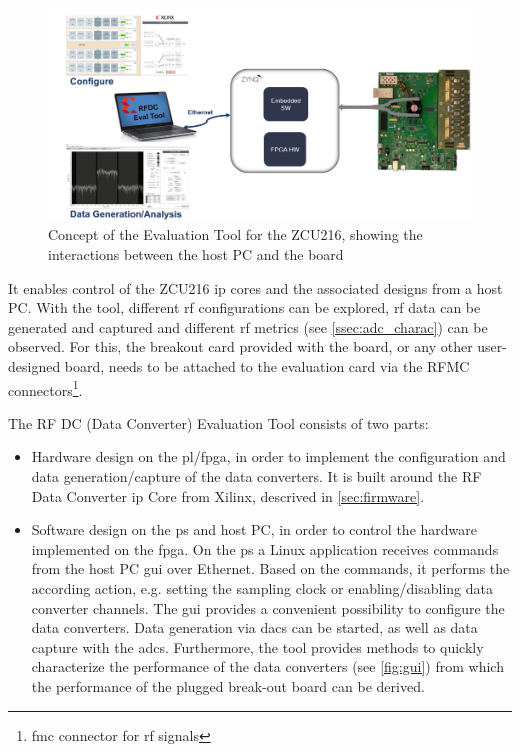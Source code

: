 \begin{figure}[H]
	\centering
	\includegraphics[width = \textwidth]{chap/05-readout/img/zcu216evaltool}
	\caption[ZCU216 Evaluation Tool]{Concept of the Evaluation Tool for the ZCU216, showing the interactions between the host PC and the board \cite{zcu216evaltool}}
	\label{fig:evalTool}
\end{figure}

It enables control of the ZCU216 \gls{ip} cores and the associated designs from a host PC. 
With the tool, different \gls{rf} configurations can be explored, \gls{rf} data can be generated and captured and different \gls{rf} metrics (see \autoref{ssec:adc_charac}) can be observed.  \cite{zcu216evaltool}
For this, the breakout card provided with the board, or any other user-designed board, needs to be attached to the evaluation card via the RFMC connectors\footnote{\gls{fmc} connector for \gls{rf} signals}.

The RF DC (Data Converter) Evaluation Tool consists of two parts:
\begin{itemize}
	\item Hardware design on the \gls{pl}/\gls{fpga}, in order to implement the configuration and data generation/capture of the data converters.
	It is built around the RF Data Converter \gls{ip} Core from Xilinx, descrived in \autoref{sec:firmware}.
	\item Software design on the \gls{ps} and host PC, in order to control the hardware implemented on the \gls{fpga}.
	On the \gls{ps} a Linux application receives commands from the host PC \gls{gui} over Ethernet.
	Based on the commands, it performs the according action, e.g. setting the sampling clock or enabling/disabling data converter channels.
	The \gls{gui} provides a convenient possibility to configure the data converters.
	Data generation via \glspl{dac} can be started, as well as data capture with the \glspl{adc}.
	Furthermore, the tool provides methods to quickly characterize the performance of the data converters (see \autoref{fig:gui}) from which the performance of the plugged break-out board can be derived.
\end{itemize}


